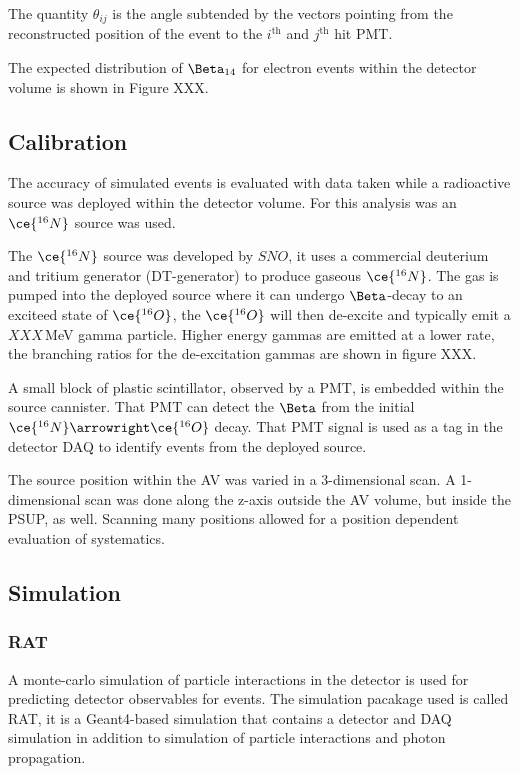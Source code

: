 The quantity $\theta_{ij}$ is the angle subtended by the vectors pointing
from the reconstructed position of the event to the $i^{\text{th}}$ and
$j^{\text{th}}$ hit PMT.

The expected distribution of $\Beta_{14}$ for electron events within the
detector volume is shown in Figure XXX.

\subsection{Calibration}
The accuracy of simulated events is evaluated with data taken while a
radioactive source was deployed within the detector volume.
For this analysis was an $\ce{^{16}N}$ source was used.

The $\ce{^{16}N}$ source was developed by $SNO$, it uses a commercial
deuterium and tritium generator (DT-generator) to produce gaseous $\ce{^{16}N}$.
The gas is pumped into the deployed source where it can undergo $\Beta$-decay
to an exciteed state of $\ce{^{16}O}$, the $\ce{^{16}O}$ will then de-excite
and typically emit a $XXX$\,MeV gamma particle. Higher energy gammas are emitted
at a lower rate, the branching ratios for the de-excitation gammas are shown in
figure XXX.

A small block of plastic scintillator, observed by a PMT, is embedded within the
source cannister. That PMT can detect the $\Beta$ from the initial
$\ce{^{16}N} \arrowright \ce{^{16}O}$ decay. That PMT signal is used as a
tag in the detector DAQ to identify events from the deployed source.

The source position within the AV was varied in a 3-dimensional
scan.
A 1-dimensional scan was done along the z-axis outside the AV volume,
but inside the PSUP, as well.
Scanning many positions allowed for a position dependent evaluation of
systematics.

\subsection{Simulation}
\subsubsection{RAT}
A monte-carlo simulation of particle interactions in the detector is used
for predicting detector observables for events.
The simulation pacakage used is called RAT, it is a Geant4-based simulation that
contains a detector and DAQ simulation in addition to simulation of particle
interactions and photon propagation.

